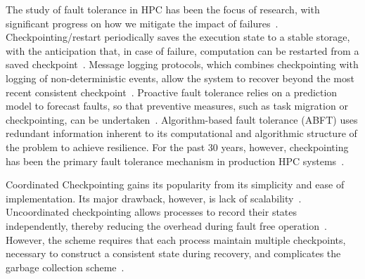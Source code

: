 
The study of fault tolerance in HPC has been the focus of research, with significant progress on how we mitigate the impact of failures~\cite{herault2015fault}. %
Checkpointing/restart periodically saves the execution state to a stable storage, with the anticipation that, in case of failure, 
computation can be restarted from a saved checkpoint~\cite{Chandy:1985:DSD:214451.214456}. 
Message logging protocols, which combines checkpointing with logging of non-deterministic events, allow the system to recover beyond the most recent consistent checkpoint~\cite{Strom85optimisticrecovery}. Proactive fault tolerance relies on a prediction model to forecast faults, so that preventive measures, such as task migration or checkpointing, can be undertaken~\cite{gainaru2012fault}. Algorithm-based fault tolerance (ABFT) uses redundant information inherent to its computational and algorithmic structure of the problem to achieve resilience. %
For the past 30 years, however, checkpointing has been the primary fault tolerance mechanism in 
production HPC systems~\cite{ferreira_sc_2011}. 

Coordinated Checkpointing gains its popularity from its simplicity and ease of implementation. Its major drawback, however, is lack of scalability~\cite{hargrove2006berkeley}.
Uncoordinated checkpointing allows processes to record their states independently, thereby reducing the overhead during fault free operation~\cite{guermouche_2011_ipdps}. 
However, the scheme requires that
each process maintain multiple checkpoints, necessary to construct a consistent state during recovery, and complicates the garbage collection scheme~\cite{Elnozahy:02:Survey}. %


